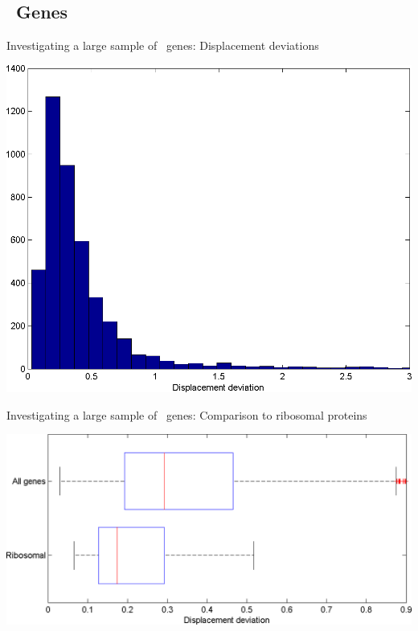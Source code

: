 \documentclass{article}
\begin{document}
\subsection{\ecoli\ Genes}
\begin{cfigure}
  \parbox{0.4\linewidth}{
    \caption{Investigating a large sample of \ecoli\ genes: Displacement deviations}
    \label{ecoli:hist}
    \includegraphics[width=\linewidth]{histograms/everything}
  }
  \qquad
  \begin{minipage}{0.4\linewidth}
    \caption{Investigating a large sample of \ecoli\ genes: Comparison
      to ribosomal proteins}
    \label{ribosomal:comp}
    \includegraphics[width=\linewidth]{histograms/ribosomal}
  \end{minipage}
\end{cfigure}

\begin{cfigure}
\end{cfigure}
\end{document}
